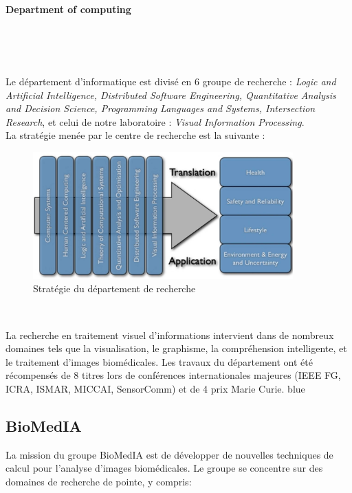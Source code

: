 \documentclass[10pt]{report}
\begin{document}
	\paragraph{Department of computing}~\par~\par
	Le département d'informatique est divisé en 6 groupe de recherche : \textit{Logic and Artificial Intelligence, Distributed Software Engineering, Quantitative Analysis and Decision Science, Programming Languages and Systems, Intersection Research}, et celui de notre laboratoire : \textit{Visual Information Processing}.\\ 
	La stratégie menée par le centre de recherche est la suivante : 
	\begin{figure}[h!]
		\begin{center}
			\includegraphics[width=10cm]{Reports/figures/research_strategy.jpg}
		\end{center}	
		\caption{Stratégie du département de recherche}
		\label{Stratégie du département de recherche}
	\end{figure}~\par 
		
	La recherche en traitement visuel d'informations intervient dans de nombreux domaines tels que la visualisation, le graphisme, la compréhension intelligente, et le traitement d'images biomédicales.  
	Les travaux du département ont été récompensés de 8 titres lors de conférences internationales majeures (IEEE FG, ICRA, ISMAR, MICCAI, SensorComm) et de 4 prix Marie Curie.
	blue

	
	\subsection{BioMedIA}
	
	La mission du groupe BioMedIA est de développer de nouvelles techniques de
	calcul pour l'analyse d'images biomédicales. Le groupe se concentre sur des
	domaines de recherche de pointe, y compris:\\
\end{document}
